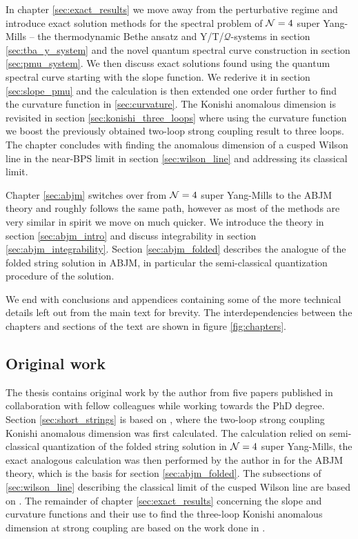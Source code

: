 In chapter \ref{sec:exact_results} we move away from the perturbative regime and introduce exact solution methods for the spectral problem of $\mathcal{N}=4$ super Yang-Mills -- the thermodynamic Bethe ansatz and Y/T/$\mathcal{Q}$-systems in section \ref{sec:tba_y_system} and the novel quantum spectral curve construction in section \ref{sec:pmu_system}.
We then discuss exact solutions found using the quantum spectral curve starting with the slope function.
We rederive it in section \ref{sec:slope_pmu} and the calculation is then extended one order further to find the curvature function in \ref{sec:curvature}.
The Konishi anomalous dimension is revisited in section \ref{sec:konishi_three_loops} where using the curvature function we boost the previously obtained two-loop strong coupling result to three loops.
The chapter concludes with finding the anomalous dimension of a cusped Wilson line in the near-BPS limit in section \ref{sec:wilson_line} and addressing its classical limit.
 
Chapter \ref{sec:abjm} switches over from $\mathcal{N}=4$ super Yang-Mills to the ABJM theory and roughly follows the same path, however as most of the methods are very similar in spirit we move on much quicker.
We introduce the theory in section \ref{sec:abjm_intro} and discuss integrability in section \ref{sec:abjm_integrability}. 
Section \ref{sec:abjm_folded} describes the analogue of the folded string solution in ABJM, in particular the semi-classical quantization procedure of the solution.

We end with conclusions and appendices containing some of the more technical details left out from the main text for brevity.
The interdependencies between the chapters and sections of the text are shown in figure \ref{fig:chapters}.

\newpage
\subsection{Original work}

The thesis contains original work by the author from five papers published in collaboration with fellow colleagues while working towards the PhD degree. 
Section \ref{sec:short_strings} is based on \cite{Gromov:2011bz}, where the two-loop strong coupling Konishi anomalous dimension was first calculated.
The calculation relied on semi-classical quantization of the folded string solution in $\mathcal{N}=4$ super Yang-Mills, the exact analogous calculation was then performed by the author in \cite{Beccaria:2012vb,Beccaria:2012qd} for the ABJM theory, which is the basis for section \ref{sec:abjm_folded}.
The subsections of \ref{sec:wilson_line} describing the classical limit of the cusped Wilson line are based on \cite{Sizov:2013joa}.
The remainder of chapter \ref{sec:exact_results} concerning the slope and curvature functions and their use to find the three-loop Konishi anomalous dimension at strong coupling are based on the work done in \cite{Gromov:2014bva}. 

